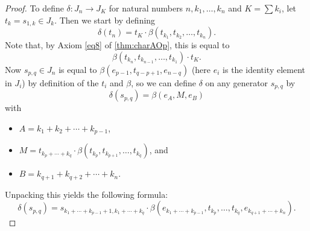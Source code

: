 \begin{proof}
To define $\delta \colon J_{n} \rightarrow J_{K}$ for natural numbers $n, k_{1}, \ldots, k_{n}$ and $K = \sum k_{i}$, let $t_{k} = s_{1,k} \in J_{k}$. Then we start by defining
  \[
    \delta(t_{n}) = t_{K} \cdot \beta(t_{k_{1}}, t_{k_{2}}, \ldots, t_{k_{n}}).
  \]
Note that, by Axiom \ref{eq8} of \cref{thm:charAOp}, this is equal to
  \[
    \beta(t_{k_{n}}, t_{k_{n-1}}, \ldots, t_{k_{1}}) \cdot t_{K}.
  \]
Now $s_{p,q} \in J_{n}$ is equal to $\beta(e_{p-1}, t_{q-p+1}, e_{n-q})$ (here $e_{i}$ is the identity element in $J_{i}$) by definition of the $t_{i}$ and $\beta$, so we can define $\delta$ on any generator $s_{p,q}$ by
  \[
    \delta(s_{p,q}) = \beta ( e_{A}, M, e_{B} )
  \]
with
  \begin{itemize}
    \item $A = k_{1} + k_{2} + \cdots + k_{p-1}$,
    \item $M = t_{k_{p}+ \cdots +k_{q}} \cdot \beta(t_{k_{p}}, t_{k_{p+1}}, \ldots, t_{k_{q}})$, and
    \item $B = k_{q+1} + k_{q+2} + \cdots + k_{n}$.
  \end{itemize}
Unpacking this yields the following formula:
  \[
  \delta(s_{p,q}) = s_{k_{1}+\cdots+k_{p-1}+1, k_{1}+\cdots+k_{q}} \cdot \beta(e_{k_{1}+\cdots+k_{p-1}}, t_{k_{p}}, \ldots, t_{k_{q}}, e_{k_{q+1}+\cdots+k_{n}}).
  \]


\end{proof}
